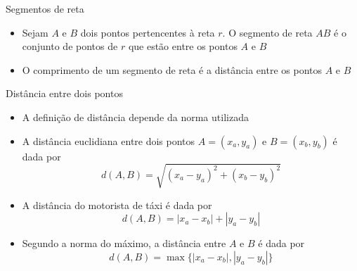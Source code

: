 \begin{frame}[fragile]{Segmentos de reta}

    \begin{itemize}
        \item Sejam $A$ e $B$ dois pontos pertencentes à reta $r$. O segmento de reta $AB$ é o conjunto de pontos de $r$ que estão entre os pontos $A$ e $B$
        \pause

        \item O comprimento de um segmento de reta é a distância entre os pontos $A$ e $B$
        \pause
    \end{itemize}

    \begin{center}
    \end{center}

\end{frame}

\begin{frame}[fragile]{Distância entre dois pontos}

    \begin{itemize}
        \item A definição de distância depende da norma utilizada
        \pause

        \item A distância euclidiana entre dois pontos $A = (x_a, y_a)$ e $B = (x_b, y_b)$ é dada por
        \[
            d(A, B) = \sqrt{(x_a - y_a)^2 + (x_b - y_b)^2}
        \]
        \pause

        \item A distância do motorista de táxi é dada por
        \[
            d(A, B) = |x_a - x_b| + |y_a - y_b|
        \]
        \pause

        \item Segundo a norma do máximo, a distância entre $A$ e $B$ é dada por
        \[
            d(A, B) = \max\lbrace |x_a - x_b|, |y_a - y_b|\rbrace
        \]
    \end{itemize}

\end{frame}

